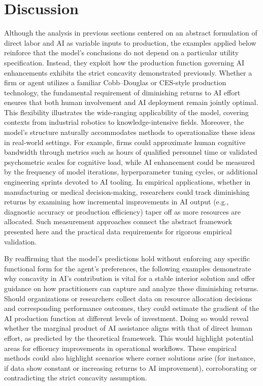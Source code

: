 \section{Discussion}
\label{sec:dis}
Although the analysis in previous sections centered on an abstract formulation of direct labor and AI as variable inputs to production, the examples applied below reinforce that the model’s conclusions do not depend on a particular utility specification. Instead, they exploit how the production function governing AI enhancements exhibits the strict concavity demonstrated previously. Whether a firm or agent utilizes a familiar Cobb–Douglas or CES-style production technology, the fundamental requirement of diminishing returns to AI effort ensures that both human involvement and AI deployment remain jointly optimal. This flexibility illustrates the wide-ranging applicability of the model, covering contexts from industrial robotics to knowledge-intensive fields. Moreover, the model’s structure naturally accommodates methods to operationalize these ideas in real-world settings. For example, firms could approximate human cognitive bandwidth through metrics such as hours of qualified personnel time or validated psychometric scales for cognitive load, while AI enhancement could be measured by the frequency of model iterations, hyperparameter tuning cycles, or additional engineering sprints devoted to AI tooling. In empirical applications, whether in manufacturing or medical decision-making, researchers could track diminishing returns by examining how incremental improvements in AI output (e.g., diagnostic accuracy or production efficiency) taper off as more resources are allocated. Such measurement approaches connect the abstract framework presented here and the practical data requirements for rigorous empirical validation.

By reaffirming that the model’s predictions hold without enforcing any specific functional form for the agent’s preferences, the following examples demonstrate why concavity in AI’s contribution is vital for a stable interior solution and offer guidance on how practitioners can capture and analyze these diminishing returns. Should organizations or researchers collect data on resource allocation decisions and corresponding performance outcomes, they could estimate the gradient of the AI production function at different levels of investment. Doing so would reveal whether the marginal product of AI assistance aligns with that of direct human effort, as predicted by the theoretical framework. This would highlight potential areas for efficency improvements in operational workflows. These empirical methods could also highlight scenarios where corner solutions arise (for instance, if data show constant or increasing returns to AI improvement), corroborating or contradicting the strict concavity assumption.

